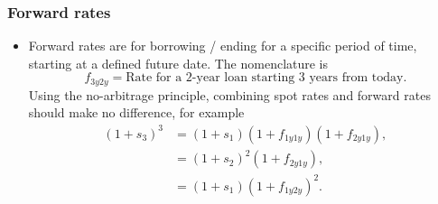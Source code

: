 \documentclass[../notes_compiled.tex]{subfiles}
\begin{document}
\subsubsection{Forward rates}
\begin{itemize}
\item Forward rates are for borrowing / ending for a specific period of time, starting at a defined future date. The nomenclature is
\begin{equation*}
f_{3y2y} = \text{Rate for a 2-year loan starting 3 years from today}.
\end{equation*}
Using the no-arbitrage principle, combining spot rates and forward rates should make no difference, for example
{\color{RedViolet}
\begin{align*}
(1+s_{3})^{3} &= (1+s_{1})(1+f_{1y1y})(1+f_{2y1y}), \\
&= (1 + s_{2})^{2}(1+f_{2y1y}), \\
&= (1+s_{1})(1+f_{1y2y})^{2}.
\end{align*}
}
\end{itemize}
\end{document}

